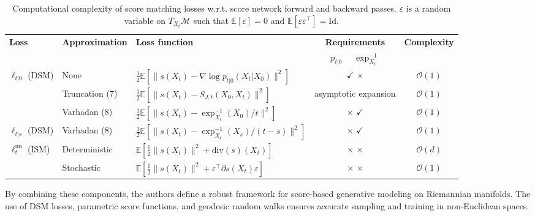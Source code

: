 \documentclass[a4paper,14pt]{article}
\theoremstyle{plain} %
\theoremstyle{definition} %
\theoremstyle{remark} %
\theoremstyle{definition}
\theoremstyle{remark}
\theoremstyle{remark}
\begin{document}
	\begin{table}[htbp]
		\centering
		\scriptsize %
		\caption{Computational complexity of score matching losses w.r.t. score network forward and backward passes. $\varepsilon$ is a random variable on $T_{X_t}\mathcal{M}$ such that $\mathbb{E}[\varepsilon] = 0$ and $\mathbb{E}[\varepsilon\varepsilon^\top] = \text{Id}$.}
		\begin{tabular}{@{}llp{6cm}cc@{}}
			\toprule
			\textbf{Loss} & \textbf{Approximation} & \textbf{Loss function} & \textbf{Requirements} & \textbf{Complexity} \\ 
			& & & $p_{t|0}$ \ \ $\exp_{X_t}^{-1}$ & \\ 
			\midrule
			\multirow{3}{*}{$\ell_{t|0}$ (DSM)} 
			& None 
			& $\frac{1}{2} \mathbb{E} \left[\|s(X_t) - \nabla \log p_{t|0}(X_t|X_0)\|^2\right]$ 
			& $\checkmark$ \quad $\times$ 
			& $\mathcal{O}(1)$ \\ 
			\cmidrule(lr){2-5}
			& Truncation (7) 
			& $\frac{1}{2} \mathbb{E} \left[\|s(X_t) - S_{J,t}(X_0, X_t)\|^2\right]$ 
			& asymptotic expansion 
			& $\mathcal{O}(1)$ \\ 
			\cmidrule(lr){2-5}
			& Varhadan (8) 
			& $\frac{1}{2} \mathbb{E} \left[\|s(X_t) - \exp_{X_t}^{-1}(X_0)/t\|^2\right]$ 
			& $\times$ \quad $\checkmark$ 
			& $\mathcal{O}(1)$ \\ 
			\midrule
			$\ell_{t|s}$ (DSM) & Varhadan (8) 
			& $\frac{1}{2} \mathbb{E} \left[\|s(X_t) - \exp_{X_t}^{-1}(X_s)/(t-s)\|^2\right]$ 
			& $\times$ \quad $\checkmark$ 
			& $\mathcal{O}(1)$ \\ 
			\midrule
			\multirow{2}{*}{$\ell_t^{\text{im}}$ (ISM)} 
			& Deterministic 
			& $\mathbb{E} \left[\frac{1}{2} \|s(X_t)\|^2 + \text{div}(s)(X_t)\right]$ 
			& $\times$ \quad $\times$ 
			& $\mathcal{O}(d)$ \\ 
			\cmidrule(lr){2-5}
			& Stochastic 
			& $\mathbb{E} \left[\frac{1}{2} \|s(X_t)\|^2 + \varepsilon^\top \partial s(X_t) \varepsilon \right]$ 
			& $\times$ \quad $\times$ 
			& $\mathcal{O}(1)$ \\ 
			\bottomrule
		\end{tabular}
	\end{table}
	
	
	By combining these components, the authors define a robust framework for score-based generative modeling on Riemannian manifolds. The use of DSM losses, parametric score functions, and geodesic random walks ensures accurate sampling and training in non-Euclidean spaces.
	
\end{document}
